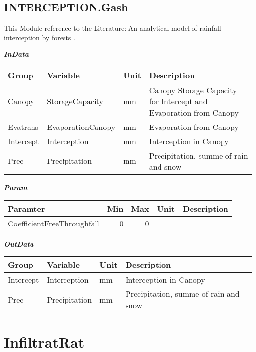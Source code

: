 \documentclass[
]{book}
\begin{document}
\hypertarget{interception.gash}{%
\subsection{INTERCEPTION.Gash}\label{interception.gash}}

This Module reference to the Literature: An analytical model of rainfall interception by forests \citep{Gash.1979}.

\textbf{\emph{InData}}

\begin{table}[!h]
\centering
\begin{tabular}{l|l|l|l}
\hline
Group & Variable & Unit & Description\\
\hline
Canopy & StorageCapacity & mm & Canopy Storage Capacity for Intercept and Evaporation from Canopy\\
\cline{1-4}
Evatrans & EvaporationCanopy & mm & Evaporation from Canopy\\
\cline{1-4}
Intercept & Interception & mm & Interception in Canopy\\
\cline{1-4}
Prec & Precipitation & mm & Precipitation, summe of rain and snow\\
\hline
\end{tabular}
\end{table}

\textbf{\emph{Param}}

\begin{table}[!h]
\centering
\begin{tabular}{l|r|r|l|l}
\hline
Paramter & Min & Max & Unit & Description\\
\hline
CoefficientFreeThroughfall & 0 & 0 & -- & --\\
\hline
\end{tabular}
\end{table}

\textbf{\emph{OutData}}

\begin{table}[!h]
\centering
\begin{tabular}{l|l|l|l}
\hline
Group & Variable & Unit & Description\\
\hline
Intercept & Interception & mm & Interception in Canopy\\
\cline{1-4}
Prec & Precipitation & mm & Precipitation, summe of rain and snow\\
\hline
\end{tabular}
\end{table}

\hypertarget{infiltratrat}{%
\section{InfiltratRat}\label{infiltratrat}}
\end{document}
